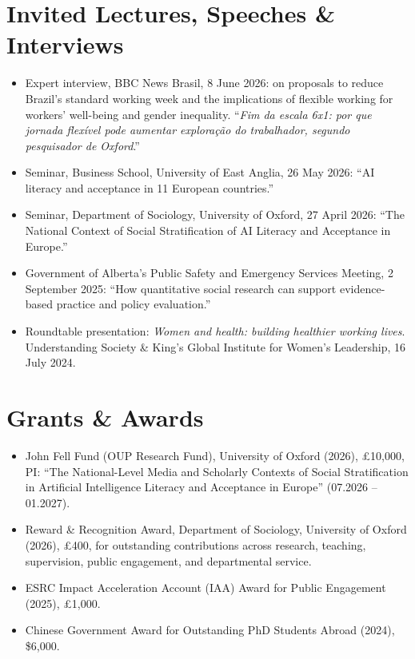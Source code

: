 \documentclass[11pt,a4paper]{article}
\begin{document}
\section*{Invited Lectures, Speeches \& Interviews}
\begin{itemize}
\item Expert interview, BBC News Brasil, 8 June 2026: on proposals to reduce Brazil's standard working week and the implications of flexible working for workers' well-being and gender inequality. ``\textit{Fim da escala 6x1: por que jornada flex\'ivel pode aumentar explora\c{c}\~ao do trabalhador, segundo pesquisador de Oxford}.''
\item Seminar, Business School, University of East Anglia, 26 May 2026: ``AI literacy and acceptance in 11 European countries.''
\item Seminar, Department of Sociology, University of Oxford, 27 April 2026: ``The National Context of Social Stratification of AI Literacy and Acceptance in Europe.''
\item Government of Alberta's Public Safety and Emergency Services Meeting, 2 September 2025: ``How quantitative social research can support evidence-based practice and policy evaluation.''
\item Roundtable presentation: \textit{Women and health: building healthier working lives}. Understanding Society \& King's Global Institute for Women's Leadership, 16 July 2024.
\end{itemize}

\section*{Grants \& Awards}
\begin{itemize}
\item John Fell Fund (OUP Research Fund), University of Oxford (2026), \pounds10{,}000, PI: ``The National-Level Media and Scholarly Contexts of Social Stratification in Artificial Intelligence Literacy and Acceptance in Europe'' (07.2026 -- 01.2027).
\item Reward \& Recognition Award, Department of Sociology, University of Oxford (2026), \pounds400, for outstanding contributions across research, teaching, supervision, public engagement, and departmental service.
\item ESRC Impact Acceleration Account (IAA) Award for Public Engagement (2025), \pounds1{,}000.
\item Chinese Government Award for Outstanding PhD Students Abroad (2024), \$6{,}000.
\end{itemize}
\end{document}
